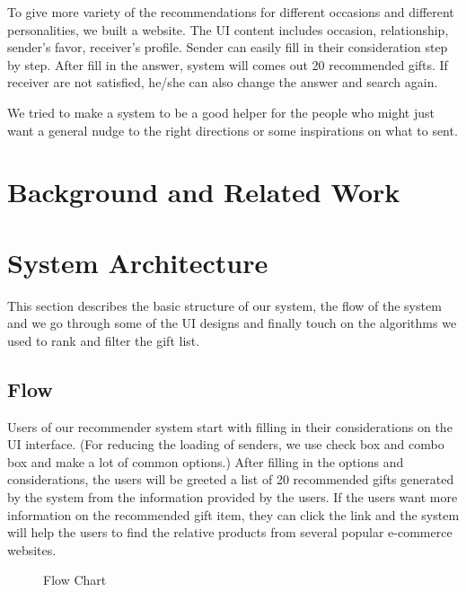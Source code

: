 \documentclass[11pt,twocolumn]{article}
\begin{document}
To give more variety of the recommendations for different occasions and different personalities, we built a website.   The UI content includes occasion, relationship, sender's favor, receiver's profile. 
Sender can easily fill in their consideration step by step. 
After fill in the answer, system will comes out 20 recommended gifts.  If receiver are not satisfied, he/she can also change the answer and search again.

We tried to make a system to be a good helper for the people who might just want a general nudge to the right directions or some inspirations on what to sent.  

\section{Background and Related Work}



\section{System Architecture}

This section describes the basic structure of our system, the flow of the system and we go through some of the UI designs and finally touch on the algorithms we used to rank and filter the gift list.

\subsection{Flow}
Users of our recommender system start with filling in their considerations on the UI interface. (For reducing the loading of senders, we use check box and combo box and make a lot of common options.)   
After filling in the options and considerations, the users will be greeted  a list of 20 recommended gifts generated by the system from the information provided by the users.
If the users want more information on the recommended gift item, they can click the link and the system will help the users to find the relative products from several popular e-commerce websites.

\begin{figure}[h!t]
\caption{Flow Chart}
\end{figure}
\end{document}
